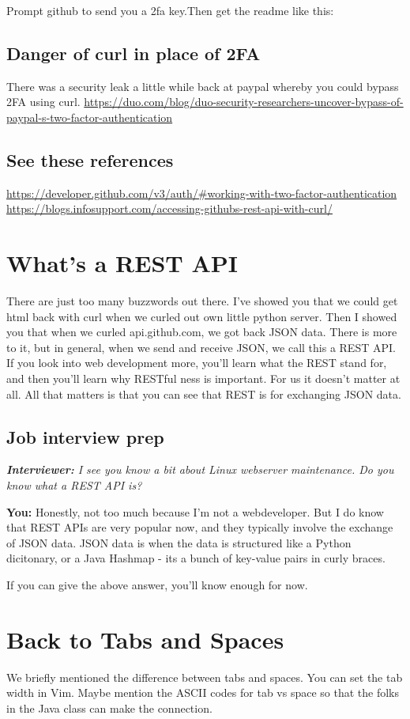 \documentclass[10pt]{article}
\begin{document}
Prompt github to send you a 2fa key.Then get the readme like this:



\subsection{Danger of curl in place of 2FA}
There was a security leak a little while back at paypal whereby you could bypass 2FA using curl.
\url{https://duo.com/blog/duo-security-researchers-uncover-bypass-of-paypal-s-two-factor-authentication}

\subsection{See these references}
\url{https://developer.github.com/v3/auth/#working-with-two-factor-authentication}
\url{https://blogs.infosupport.com/accessing-githubs-rest-api-with-curl/}

\section{What's a REST API}
There are just too many buzzwords out there. I've showed you that we could get html back with curl when we curled out own little python server. Then I showed you that when we curled api.github.com, we got back JSON data. There is more to it, but in general, when we send and receive JSON, we call this a REST API. If you look into web development more, you'll  learn what the REST stand for, and then you'll learn why RESTful ness is important. For us it doesn't matter at all. All that matters is that you can see that REST is for exchanging JSON data.

\subsection{Job interview prep}
\noindent\textit{\textbf{Interviewer:} I see you know a bit about Linux webserver maintenance. Do you know what a REST API is?}

\noindent \textbf{You: } Honestly, not too much because I'm not a webdeveloper. But I do know that REST APIs are very popular now, and they typically involve the exchange of JSON data. JSON data is when the data is structured like a Python dicitonary, or a Java Hashmap  - its a bunch of key-value pairs in curly braces.

If you can give the above answer, you'll know enough for now.

\section{Back to Tabs and Spaces}
We briefly mentioned the difference between tabs and spaces. You can set the tab width in Vim. Maybe mention the ASCII codes for tab vs space so that the folks in the Java class can make the connection.
\end{document}
